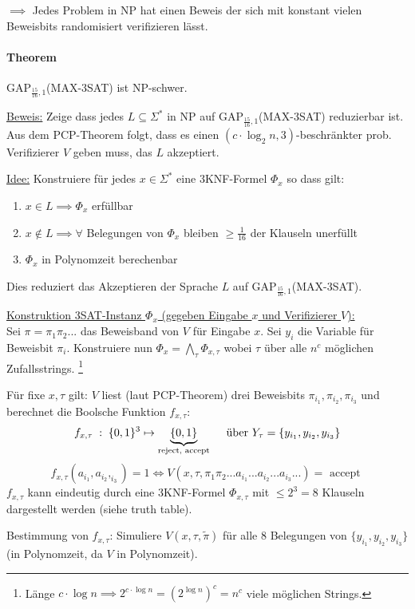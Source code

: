 $\implies$ Jedes Problem in NP hat einen Beweis der sich mit konstant vielen Beweisbits
randomisiert verifizieren lässt.

\paragraph{Theorem}
GAP$_{\frac{15}{16}, 1}$(MAX-3SAT) ist NP-schwer.

\underline{Beweis:}
Zeige dass jedes $L \subseteq \Sigma^*$ in NP auf GAP$_{\frac{15}{16}, 1}$(MAX-3SAT) reduzierbar ist.
Aus dem PCP-Theorem folgt, dass es einen $( c \cdot \log_2 n , 3 )$-beschränkter prob.
Verifizierer $V$ geben muss, das $L$ akzeptiert.

\underline{Idee:}
Konstruiere für jedes $x \in \Sigma^*$ eine 3KNF-Formel $\Phi_x$ so dass gilt:
\begin{enumerate}[label=(\roman*)]
    \item $x \in L \implies \Phi_x$ erfüllbar
    \item $x \notin L \implies \forall $ Belegungen von $\Phi_x$ bleiben $\geq \frac{1}{16}$ der
        Klauseln unerfüllt
    \item $\Phi_x$ in Polynomzeit berechenbar
\end{enumerate}
Dies reduziert das Akzeptieren der Sprache $L$ auf GAP$_{\frac{15}{16}, 1}$(MAX-3SAT).

\underline{Konstruktion 3SAT-Instanz $\Phi_x$ (gegeben Eingabe $x$ und Verifizierer $V$):}
\\
Sei $\pi = \pi_1 \pi_2 ...$ das Beweisband von $V$ für Eingabe $x$.
Sei $y_i$ die Variable für Beweisbit $\pi_i$.
Konstruiere nun $\Phi_x = \bigwedge_\tau \Phi_{x, \tau}$
wobei $\tau$ über alle $n^c$ möglichen Zufallsstrings.
\footnote{Länge $c \cdot \log n \implies 2^{c \cdot \log n} = (2^{\log n})^c = n^c $
viele möglichen Strings.}

Für fixe $x, \tau$ gilt: $V$ liest (laut PCP-Theorem) drei Beweisbits $\pi_{i_1}, \pi_{i_2}, \pi_{i_3}$
und berechnet die Boolsche Funktion $f_{x, \tau}$:
%
$$ f_{x, \tau} \; : \; \lbrace 0, 1 \rbrace^3 \mapsto \underbrace{\lbrace 0, 1 \rbrace}_\text{reject, accept} \quad
\text{ über } Y_\tau = \{ y_{i_1}, y_{i_2}, y_{i_3} \} $$
$$ f_{x, \tau}(a_{i_1}, a_{i_2}, _{i_3}) = 1 \iff
V(x, \tau, \pi_1 \pi_2 ... a_{i_1} ... a_{i_2} ... a_{i_3} ... ) = \text{ accept } $$
%
$f_{x, \tau}$ kann eindeutig durch eine 3KNF-Formel $\Phi_{x, \tau}$
mit $\leq 2^3 = 8$ Klauseln dargestellt werden (siehe truth table).

Bestimmung von $f_{x, \tau}$: Simuliere $V(x, \tau, \tilde{\pi})$ für alle 8 Belegungen von
$\{ y_{i_1}, y_{i_2}, y_{i_3} \}$ (in Polynomzeit, da $V$ in Polynomzeit).

